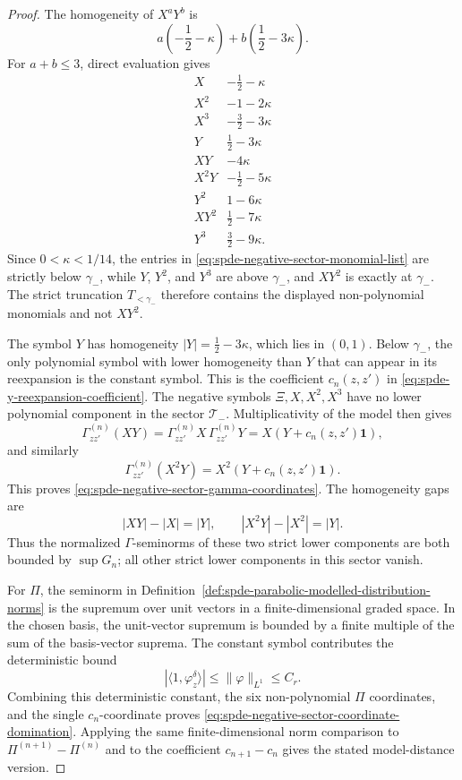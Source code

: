 \begin{proof}
The homogeneity of \(X^aY^b\) is
\[
  a\left(-\frac12-\kappa\right)
  +
  b\left(\frac12-3\kappa\right).
\]
For \(a+b\leq3\), direct evaluation gives
\[
\begin{array}{c|c}
  X & -\frac12-\kappa\\
  X^2 & -1-2\kappa\\
  X^3 & -\frac32-3\kappa\\
  Y & \frac12-3\kappa\\
  XY & -4\kappa\\
  X^2Y & -\frac12-5\kappa\\
  Y^2 & 1-6\kappa\\
  XY^2 & \frac12-7\kappa\\
  Y^3 & \frac32-9\kappa .
\end{array}
\]
Since \(0<\kappa<1/14\), the entries in
\eqref{eq:spde-negative-sector-monomial-list} are strictly below
\(\gamma_-\), while \(Y\), \(Y^2\), and \(Y^3\) are above
\(\gamma_-\), and \(XY^2\) is exactly at \(\gamma_-\).  The strict
truncation \(T_{<\gamma_-}\) therefore contains the displayed
non-polynomial monomials and not \(XY^2\).

The symbol \(Y\) has homogeneity \(|Y|=\frac12-3\kappa\), which lies in
\((0,1)\).  Below \(\gamma_-\), the only polynomial symbol with lower
homogeneity than \(Y\) that can appear in its reexpansion is the constant
symbol.  This is the coefficient \(c_n(z,z')\) in
\eqref{eq:spde-y-reexpansion-coefficient}.  The negative symbols
\(\Xi,X,X^2,X^3\) have no lower polynomial component in the sector
\(\mathcal T_-\).  Multiplicativity of the model then gives
\[
  \Gamma_{zz'}^{(n)}(XY)
  =
  \Gamma_{zz'}^{(n)}X\,\Gamma_{zz'}^{(n)}Y
  =
  X(Y+c_n(z,z')\mathbf 1),
\]
and similarly
\[
  \Gamma_{zz'}^{(n)}(X^2Y)
  =
  X^2(Y+c_n(z,z')\mathbf 1).
\]
This proves \eqref{eq:spde-negative-sector-gamma-coordinates}.  The
homogeneity gaps are
\[
  |XY|-|X|=|Y|,\qquad
  |X^2Y|-|X^2|=|Y|.
\]
Thus the normalized \(\Gamma\)-seminorms of these two strict lower
components are both bounded by \(\sup G_n\); all other strict lower
components in this sector vanish.

For \(\Pi\), the seminorm in
Definition~\ref{def:spde-parabolic-modelled-distribution-norms} is the
supremum over unit vectors in a finite-dimensional graded space.  In the
chosen basis, the unit-vector supremum is bounded by a finite multiple of
the sum of the basis-vector suprema.  The constant symbol contributes the
deterministic bound
\[
  |\langle1,\varphi_z^\delta\rangle|
  \leq
  \|\varphi\|_{L^1}
  \leq C_r .
\]
Combining this deterministic constant, the six non-polynomial \(\Pi\)
coordinates, and the single \(c_n\)-coordinate proves
\eqref{eq:spde-negative-sector-coordinate-domination}.  Applying the same
finite-dimensional norm comparison to
\(\Pi^{(n+1)}-\Pi^{(n)}\) and to the coefficient
\(c_{n+1}-c_n\) gives the stated model-distance version.
\end{proof}

